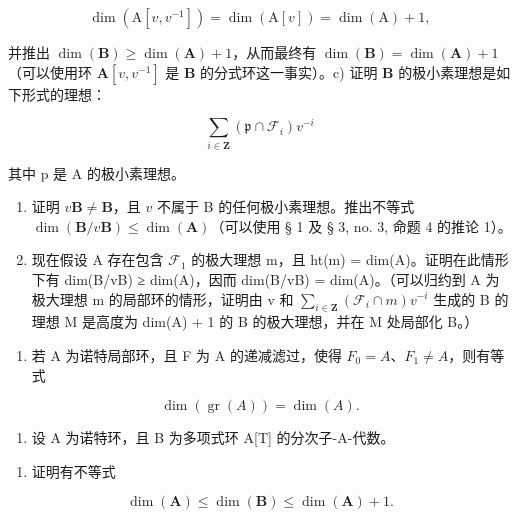 \[
\dim (\mathrm{A} [ v, v ^ {- 1} ]) = \dim (\mathrm{A} [ v ]) = \dim (\mathrm{A}) + 1,
\]

并推出 \(\dim(\mathbf{B}) \geqslant \dim(\mathbf{A}) + 1\)，从而最终有 \(\dim(\mathbf{B}) = \dim(\mathbf{A}) + 1\)（可以使用环 \(\mathbf{A}[v, v^{-1}]\) 是 \(\mathbf{B}\) 的分式环这一事实）。c) 证明 \(\mathbf{B}\) 的极小素理想是如下形式的理想：

\[
\sum_ {i \in \mathbf {Z}} \left(\mathfrak {p} \cap \mathcal {F} _ {i}\right) v ^ {- i}
\]

其中 p 是 A 的极小素理想。

\begin{enumerate}
\def\labelenumi{\alph{enumi})}
\setcounter{enumi}{3}
\item
  证明 \(v\mathbf{B} \neq \mathbf{B}\)，且 \(v\) 不属于 B 的任何极小素理想。推出不等式 \(\dim(\mathbf{B}/v\mathbf{B}) \leqslant \dim(\mathbf{A})\)（可以使用 § 1 及 § 3, no. 3, 命题 4 的推论 1）。
\item
  现在假设 A 存在包含 \(\mathcal{F}_1\) 的极大理想 m，且 ht(m) = dim(A)。证明在此情形下有 dim(B/vB) ≥ dim(A)，因而 dim(B/vB) = dim(A)。（可以归约到 A 为极大理想 m 的局部环的情形，证明由 v 和 \(\sum_{i\in\mathbf{Z}}(\mathcal{F}_i\cap m)v^{-i}\) 生成的 B 的理想 M 是高度为 dim(A) + 1 的 B 的极大理想，并在 M 处局部化 B。）
\end{enumerate}





\begin{enumerate}
\def\labelenumi{\alph{enumi})}
\setcounter{enumi}{5}
\tightlist
\item
  若 A 为诺特局部环，且 F 为 A 的递减滤过，使得 \(F_{0} = A\)、\(F_{1} \neq A\)，则有等式
\end{enumerate}

\[
\dim (\operatorname{gr} (A)) = \dim (A).
\]

\begin{enumerate}
\def\labelenumi{\arabic{enumi})}
\setcounter{enumi}{7}
\tightlist
\item
  设 A 为诺特环，且 B 为多项式环 A{[}T{]} 的分次子-A-代数。
\end{enumerate}

\begin{enumerate}
\def\labelenumi{\alph{enumi})}
\tightlist
\item
  证明有不等式
\end{enumerate}

\[
\dim (\mathbf {A}) \leqslant \dim (\mathbf {B}) \leqslant \dim (\mathbf {A}) + 1.
\]

